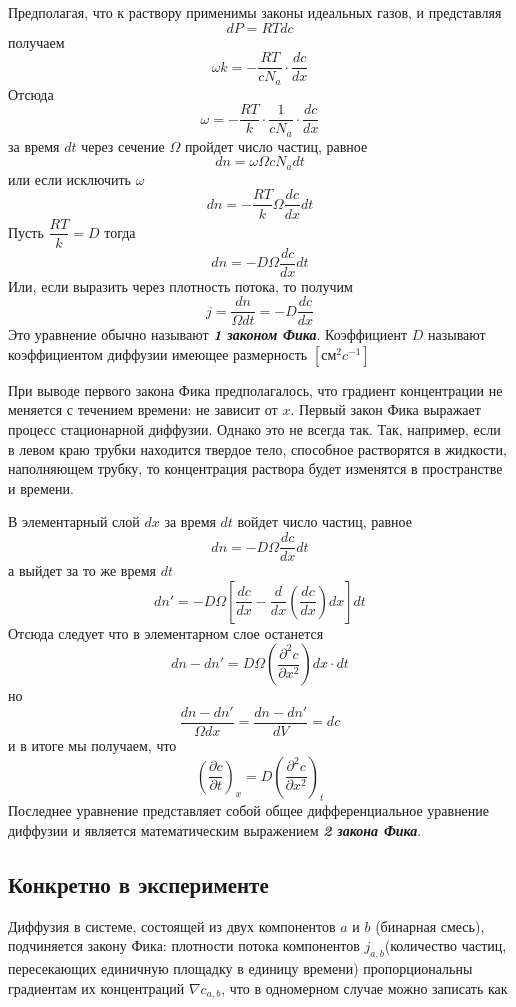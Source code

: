 \documentclass[a4paper, 14pt]{article}%
\begin{document}
Предполагая, что к раствору применимы законы идеальных газов, и представляя 
\[dP = RTdc\]
получаем 
\[\omega k = -\dfrac{RT}{cN_a} \cdot \dfrac{dc}{dx}\]
Отсюда 
\[\omega = -\dfrac{RT}{k} \cdot \dfrac{1}{cN_a} \cdot \dfrac{dc}{dx}\]
за время $dt$ через сечение $\Omega$ пройдет число частиц, равное 
\[dn = \omega \Omega c N_a dt\]
или если исключить $\omega$
\[dn = -\dfrac{RT}{k} \Omega \dfrac{dc}{dx}dt\]
Пусть $\dfrac{RT}{k} = D$ тогда 
\[dn = - D \Omega \dfrac{dc}{dx} dt\]
Или, если выразить через плотность потока, то получим
\[j = \dfrac{dn}{\Omega dt} = -D \dfrac{dc}{dx}\]
Это уравнение обычно называют \textit{\textbf{1 законом Фика}}. Коэффициент $D$ называют коэффициентом диффузии имеющее размерность $[\text{см}^2 c^{-1}]$

При выводе первого закона Фика предполагалось, что градиент концентрации не меняется с течением времени: не зависит от $x$. Первый закон Фика выражает процесс стационарной диффузии. Однако это не всегда так. Так, например, если в левом краю трубки находится твердое тело, способное растворятся в жидкости, наполняющем трубку, то концентрация раствора будет изменятся в пространстве и времени. 

В элементарный слой $dx$ за время $dt$ войдет число частиц, равное 
\[dn = -D \Omega \dfrac{dc}{dx} dt\]
а выйдет за то же время $dt$
\[dn' = -D \Omega \left[ \dfrac{dc}{dx} - \dfrac{d}{dx} \left( \dfrac{dc}{dx} \right) dx \right] dt \]
Отсюда следует что в элементарном слое останется 
\[dn - dn' = D \Omega \left(\dfrac{\partial^2c}{\partial x^2} \right) dx \cdot dt\]
но 
\[\dfrac{dn - dn'}{\Omega dx} = \dfrac{dn - dn'}{dV} = dc\]
и в итоге мы получаем, что 
\[\left( \dfrac{\partial c}{\partial t} \right)_x = D \left(\dfrac{\partial^2c}{\partial x^2} \right)_t\]
Последнее уравнение представляет собой общее дифференциальное уравнение диффузии и является математическим выражением \emph{\textit{\textbf{2 закона Фика}}}.
\subsection*{Конкретно в эксперименте}
Диффузия в системе, состоящей из двух компонентов $a$ и $b$ (бинарная
смесь), подчиняется закону Фика: плотности потока компонентов $j_{a, b}$(количество частиц, пересекающих единичную площадку в единицу времени) пропорциональны градиентам их концентраций $\nabla c_{a,b}$, что в одномерном случае можно записать как
\end{document}
